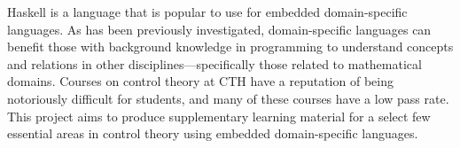 \noindent
Haskell is a language that is popular to use for embedded domain-specific languages. 
As has been previously investigated, domain-specific languages can benefit those with background knowledge in programming to understand concepts and relations in other disciplines---specifically those related to mathematical domains.
Courses on control theory at CTH have a reputation of being notoriously difficult for students, and many of these courses have a low pass rate. 
This project aims to produce supplementary learning material for a select few essential areas in control theory using embedded domain-specific languages. 
